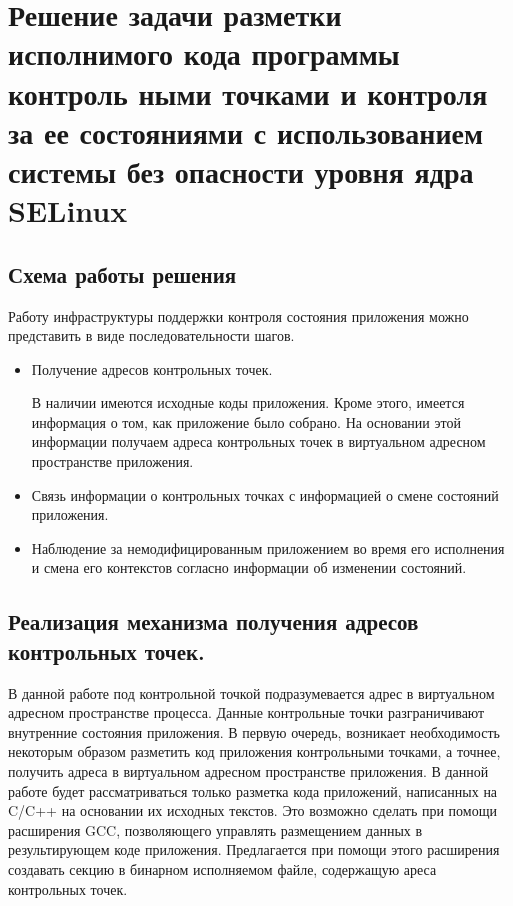 
\section{Решение задачи разметки исполнимого кода программы контроль
ными точками и контроля за ее состояниями с использованием системы без
опасности уровня ядра SELinux}

\subsection{Схема работы решения}

Работу инфраструктуры поддержки 
контроля состояния приложения можно 
представить в виде последовательности шагов.
\bigskip
\begin{itemize}
\item	Получение адресов контрольных точек.

	В наличии имеются исходные коды 
	приложения. Кроме этого, имеется 
	информация о том, как приложение 
	было собрано. На основании этой 
	информации получаем адреса 
	контрольных точек в виртуальном 
	адресном пространстве приложения. 

\item 	Связь информации о контрольных 
	точках с информацией о смене состояний
	приложения.

\item 	Наблюдение за немодифицированным 
	приложением во время его исполнения 
	и смена его контекстов согласно 
	информации об изменении состояний. 

\end{itemize}  


\bigskip 
\subsection{Реализация механизма получения
	адресов контрольных точек.}

В данной работе под контрольной точкой 
подразумевается адрес в виртуальном 
адресном пространстве процесса. 
Данные контрольные точки разграничивают
внутренние состояния приложения.  
В первую очередь, возникает необходимость 
некоторым образом разметить код приложения 
контрольными точками, а точнее, получить адреса 
в виртуальном адресном пространстве приложения. 
В данной работе будет рассматриваться только
разметка кода приложений, написанных на C/C++ 
на основании их исходных текстов. Это возможно 
сделать при помощи  расширения GCC, позволяющего
управлять размещением данных в результирующем 
коде приложения. Предлагается при помощи 
этого расширения создавать секцию в бинарном 
исполняемом файле, содержащую ареса 
контрольных точек.

